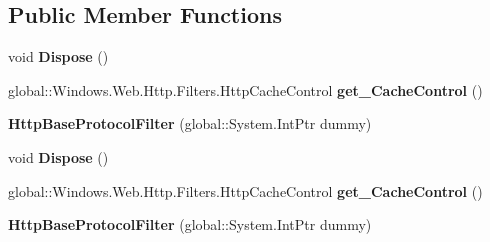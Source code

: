 \subsection*{Public Member Functions}
\begin{DoxyCompactItemize}
\item 
\mbox{\label{class_windows_1_1_web_1_1_http_1_1_filters_1_1_http_base_protocol_filter_a9edd38f75748212aab2c674e5d289759}} 
void {\bfseries Dispose} ()
\item 
\mbox{\label{class_windows_1_1_web_1_1_http_1_1_filters_1_1_http_base_protocol_filter_a32f94ba5ce4073e498dd59213d098acb}} 
global\+::\+Windows.\+Web.\+Http.\+Filters.\+Http\+Cache\+Control {\bfseries get\+\_\+\+Cache\+Control} ()
\item 
\mbox{\label{class_windows_1_1_web_1_1_http_1_1_filters_1_1_http_base_protocol_filter_a69e9922da152c52a3c5422fccb6f8a7a}} 
{\bfseries Http\+Base\+Protocol\+Filter} (global\+::\+System.\+Int\+Ptr dummy)
\item 
\mbox{\label{class_windows_1_1_web_1_1_http_1_1_filters_1_1_http_base_protocol_filter_a9edd38f75748212aab2c674e5d289759}} 
void {\bfseries Dispose} ()
\item 
\mbox{\label{class_windows_1_1_web_1_1_http_1_1_filters_1_1_http_base_protocol_filter_a32f94ba5ce4073e498dd59213d098acb}} 
global\+::\+Windows.\+Web.\+Http.\+Filters.\+Http\+Cache\+Control {\bfseries get\+\_\+\+Cache\+Control} ()
\item 
\mbox{\label{class_windows_1_1_web_1_1_http_1_1_filters_1_1_http_base_protocol_filter_a69e9922da152c52a3c5422fccb6f8a7a}} 
{\bfseries Http\+Base\+Protocol\+Filter} (global\+::\+System.\+Int\+Ptr dummy)
\item 
\mbox{\label{class_windows_1_1_web_1_1_http_1_1_filters_1_1_http_base_protocol_filter_a9edd38f75748212aab2c674e5d289759}} 

\end{DoxyCompactItemize}
